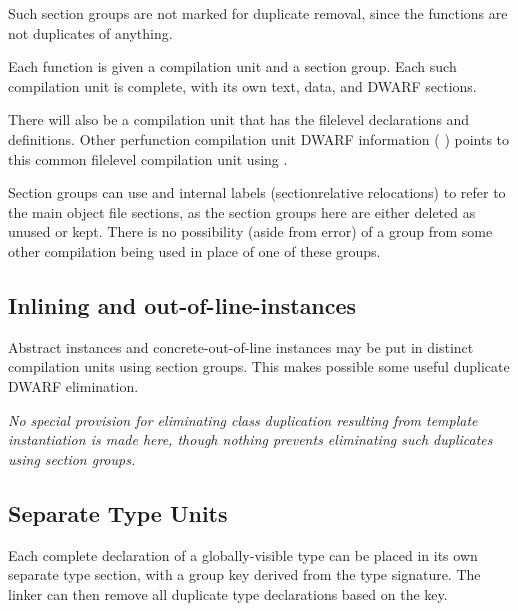 Such section groups are not marked for duplicate removal,
since the functions are not duplicates of anything.

Each function is given a compilation unit and a section
group. Each such compilation unit is complete, with its own
text, data, and DWARF sections.

There will also be a compilation unit that has the file\dash level
declarations and definitions. Other per\dash function compilation
unit DWARF information (
) points to this common
file\dash level compilation unit using .

Section groups can use  and internal labels
(section\dash relative relocations) to refer to the main object
file sections, as the section groups here are either deleted
as unused or kept. There is no possibility (aside from error)
of a group from some other compilation being used in place
of one of these groups.


\subsection{Inlining and out-of-line-instances}
\label{app:inliningandoutoflineinstances}

Abstract instances
and concrete-out-of-line instances may be
put in distinct compilation units using section groups. This
makes possible some useful duplicate DWARF elimination.

\textit{No special provision for eliminating class duplication
resulting from template instantiation is made here, though
nothing prevents eliminating such duplicates using section
groups.}


\subsection{Separate Type Units}
\label{app:separatetypeunits}

Each complete declaration of a globally-visible type can be
placed in its own separate type section, with a group key
derived from the type signature. The linker can then remove
all duplicate type declarations based on the key.

